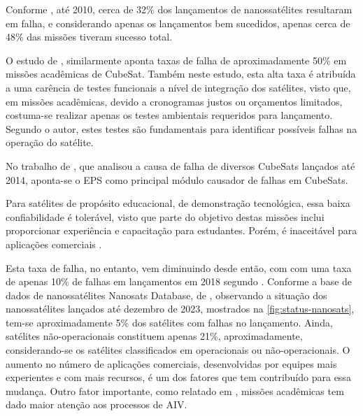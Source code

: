 Conforme \textcite{survey-nanosat-missions-2010}, até 2010, cerca de 32\% dos lançamentos de nanossatélites resultaram em falha, e considerando apenas os lançamentos bem sucedidos, apenas cerca de 48\% das missões tiveram sucesso total.

O estudo de \textcite{first-100-cubesats}, similarmente aponta taxas de falha de aproximadamente 50\% em missões acadêmicas de CubeSat.
Também neste estudo, esta alta taxa é atribuída a uma carência de testes funcionais a nível de integração dos satélites, visto que, em missões acadêmicas, devido a cronogramas justos ou orçamentos limitados, costuma-se realizar apenas os testes ambientais requeridos para lançamento.
Segundo o autor, estes testes são fundamentais para identificar possíveis falhas na operação do satélite.

No trabalho de \textcite{reliability-of-cubesats}, que analisou a causa de falha de diversos CubeSats lançados até 2014, aponta-se o \gls{EPS} como principal módulo causador de falhas em CubeSats.

Para satélites de propósito educacional, de demonstração tecnológica, essa baixa confiabilidade é tolerável, visto que parte do objetivo destas missões inclui proporcionar experiência e capacitação para estudantes.
Porém, é inaceitável para aplicações comerciais \cite{overview-nanosat-test}.

Esta taxa de falha, no entanto, vem diminuindo desde então, com com uma taxa de apenas 10\% de falhas em lançamentos em 2018 segundo \textcite{aiv-istsat-1}. Conforme a base de dados de nanossatélites Nanosats Database, de \textcite{nanosats-database}, observando a situação dos nanossatélites lançados até dezembro de 2023, mostrados na \autoref{fig:status-nanosats}, tem-se aproximadamente 5\% dos satélites com falhas no lançamento. Ainda, satélites não-operacionais constituem apenas 21\%, aproximadamente, considerando-se os satélites classificados em operacionais ou não-operacionais.
O aumento no número de aplicações comerciais, desenvolvidas por equipes mais experientes e com mais recursos, é um dos fatores que tem contribuído para essa mudança.
Outro fator importante, como relatado em \textcite{aiv-istsat-1}, missões acadêmicas tem dado maior atenção aos processos de \gls{AIV}.

